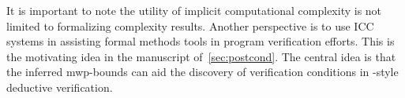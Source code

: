 It is important to note the utility of implicit computational complexity is not
limited to formalizing complexity results. Another perspective is to use ICC
systems in assisting formal methods tools in program verification efforts. This
is the motivating idea in the manuscript of~\autoref{sec:postcond}. The central
idea is that the inferred mwp-bounds can aid the discovery of verification
conditions in -style deductive verification.
